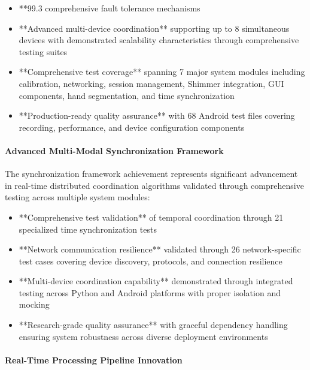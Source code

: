 \documentclass[11pt,a4paper]{article}
\begin{document}
\begin{itemize}
\item **99.3%
  comprehensive fault tolerance mechanisms
\item **Advanced multi-device coordination** supporting up to 8 simultaneous devices with demonstrated scalability
  characteristics through comprehensive testing suites
\item **Comprehensive test coverage** spanning 7 major system modules including calibration, networking, session
  management, Shimmer integration, GUI components, hand segmentation, and time synchronization
\item **Production-ready quality assurance** with 68 Android test files covering recording, performance, and device
  configuration components

\end{itemize}
\paragraph{Advanced Multi-Modal Synchronization Framework}

The synchronization framework achievement represents significant advancement in real-time distributed coordination
algorithms validated through comprehensive testing across multiple system modules:

\begin{itemize}
\item **Comprehensive test validation** of temporal coordination through 21 specialized time synchronization tests
\item **Network communication resilience** validated through 26 network-specific test cases covering device discovery,
  protocols, and connection resilience
\item **Multi-device coordination capability** demonstrated through integrated testing across Python and Android
  platforms with proper isolation and mocking
\item **Research-grade quality assurance** with graceful dependency handling ensuring system robustness across diverse
  deployment environments

\end{itemize}
\paragraph{Real-Time Processing Pipeline Innovation}
\end{document}
